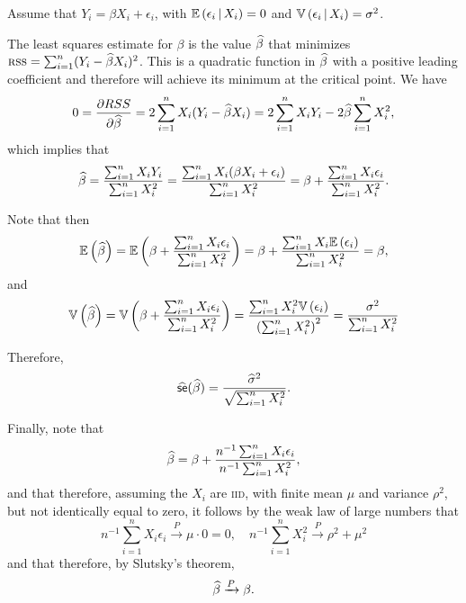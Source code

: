 \begin{ex}
  Assume that $Y_i=\beta X_i+\epsilon_i$, with $\mathbb{E}\left(\epsilon_i \,\middle|\, X_i\right)=0$
  and $\mathbb{V}\left(\epsilon_i \,\middle|\, X_i\right)=\sigma^2$.

  The least squares estimate for $\beta$ is the value $\widehat{\beta}$ that minimizes
  $\textsc{rss}=\sum_{i=1}^n(Y_i-\widehat{\beta} X_i)^2$. This is a quadratic function
  in $\widehat{\beta}$ with a positive leading coefficient and therefore will achieve
  its minimum at the critical point. We have
  \[
    0
    =\frac{\partial RSS}{\partial\widehat{\beta}}
    =2\sum_{i=1}^nX_i(Y_i-\widehat{\beta} X_i)
    =2\sum_{i=1}^n X_iY_i-2\widehat{\beta}\sum_{i=1}^n X_i^2,
  \]
  which implies that
  \[
    \widehat{\beta}
    =\frac{\sum_{i=1}^n X_iY_i}{\sum_{i=1}^n X_i^2}
    =\frac{\sum_{i=1}^n X_i(\beta X_i+\epsilon_i)}{\sum_{i=1}^n X_i^2}
    =\beta+\frac{\sum_{i=1}^n X_i\epsilon_i}{\sum_{i=1}^n X_i^2}.
  \]

  Note that then
  \[
    \mathbb{E}\left(\widehat{\beta}\right)
    =\mathbb{E}\left(\beta+\frac{\sum_{i=1}^n X_i\epsilon_i}{\sum_{i=1}^n X_i^2}\right)
    =\beta+\frac{\sum_{i=1}^n X_i\mathbb{E}\left(\epsilon_i\right)}{\sum_{i=1}^n X_i^2}
    =\beta,
  \]
  and
  \[
    \mathbb{V}\left(\widehat{\beta}\right)
    =\mathbb{V}\left(\beta+\frac{\sum_{i=1}^n X_i\epsilon_i}{\sum_{i=1}^n X_i^2}\right)
    =\frac{\sum_{i=1}^n X_i^2\mathbb{V}\left(\epsilon_i\right)}{\left(\sum_{i=1}^n X_i^2\right)^2}
    =\frac{\sigma^2}{\sum_{i=1}^nX_i^2}
  \]

  Therefore,
  \[
    \widehat{\textsf{se}}(\widehat{\beta})=\frac{\widehat{\sigma}^2}{\sqrt{\sum_{i=1}^nX_i^2}}.
  \]

  Finally, note that
  \[
    \widehat{\beta}
    =\beta+\frac{n^{-1}\sum_{i=1}^n X_i\epsilon_i}{n^{-1}\sum_{i=1}^n X_i^2},
  \]
  and that therefore, assuming the $X_i$ are \textsc{iid}, with finite mean
  $\mu$ and variance $\rho^2$, but not identically equal to zero, it follows by
  the weak law of large numbers that
  \[
    n^{-1}\sum_{i=1}^n X_i\epsilon_i\xrightarrow{P} \mu\cdot 0 =0,\quad
    n^{-1}\sum_{i=1}^n X_i^2\xrightarrow{P}\rho^2+\mu^2
  \]
  and that therefore, by Slutsky's theorem,
  \[
    \widehat{\beta}\xrightarrow{P} \beta.
  \]
\end{ex}

\newcommand{\Rtr}{\widehat{R}_\text{tr}}

